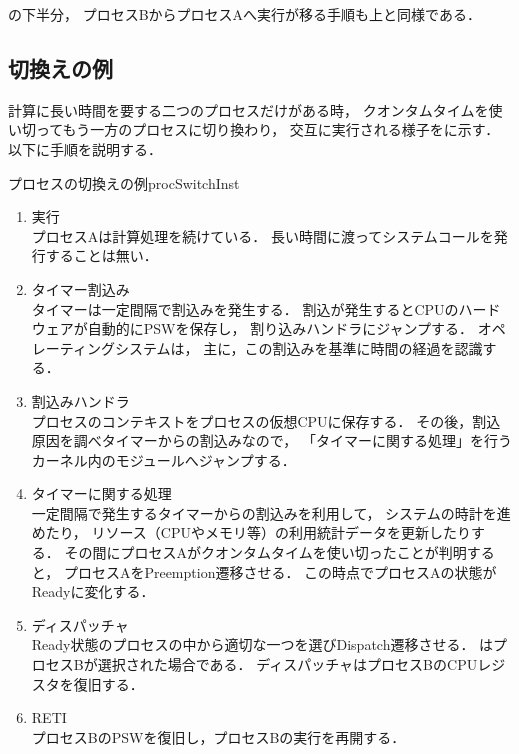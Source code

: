 の下半分，
プロセスBからプロセスAへ実行が移る手順も上と同様である．


\subsection{切換えの例}
計算に長い時間を要する二つのプロセスだけがある時，
クオンタムタイムを使い切ってもう一方のプロセスに切り換わり，
交互に実行される様子をに示す．
以下に手順を説明する．

{プロセスの切換えの例}{procSwitchInst}

\begin{enumerate}
\item 実行 \\
プロセスAは計算処理を続けている．
長い時間に渡ってシステムコールを発行することは無い．

\item タイマー割込み \\
タイマーは一定間隔で割込みを発生する．
割込が発生するとCPUのハードウェアが自動的にPSWを保存し，
割り込みハンドラにジャンプする．
オペレーティングシステムは，
主に，この割込みを基準に時間の経過を認識する．

\item 割込みハンドラ \\
プロセスのコンテキストをプロセスの仮想CPUに保存する．
その後，割込原因を調べタイマーからの割込みなので，
「タイマーに関する処理」を行うカーネル内のモジュールへジャンプする．

\item タイマーに関する処理 \\
一定間隔で発生するタイマーからの割込みを利用して，
システムの時計を進めたり，
リソース（CPUやメモリ等）の利用統計データを更新したりする．
その間にプロセスAがクオンタムタイムを使い切ったことが判明すると，
プロセスAをPreemption遷移させる．
この時点でプロセスAの状態がReadyに変化する．

\item ディスパッチャ \\
Ready状態のプロセスの中から適切な一つを選びDispatch遷移させる．
はプロセスBが選択された場合である．
ディスパッチャはプロセスBのCPUレジスタを復旧する．

\item RETI \\
プロセスBのPSWを復旧し，プロセスBの実行を再開する．


\end{enumerate}

